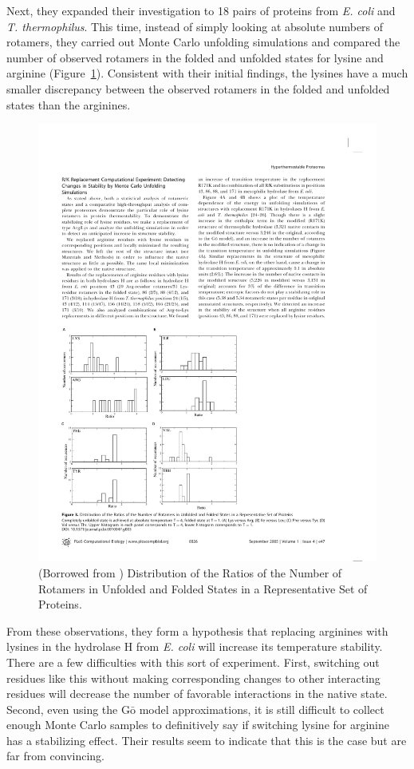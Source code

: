 Next, they expanded their investigation to 18 pairs of proteins from \emph{E. coli} and \emph{T. thermophilus}. This time, instead of simply looking at absolute numbers of rotamers, they carried out Monte Carlo unfolding simulations and compared the number of observed rotamers in the folded and unfolded states for lysine and arginine (Figure~\ref{fig:rotamer_ratios}). Consistent with their initial findings, the lysines have a much smaller discrepancy between the observed rotamers in the folded and unfolded states than the arginines.

\begin{figure}[h]
	\center
	\includegraphics{rotamer_ratio}
	\caption{(Borrowed from \cite{Berezovsky:2005p40}) Distribution of the Ratios of the Number of Rotamers in Unfolded and Folded States in a Representative Set of Proteins.}
	\label{fig:rotamer_ratios}
\end{figure}

From these observations, they form a hypothesis that replacing arginines with lysines in the hydrolase H from \emph{E. coli} will increase its temperature stability. There are a few difficulties with this sort of experiment. First, switching out residues like this without making corresponding changes to other interacting residues will decrease the number of favorable interactions in the native state. Second, even using the $\mathrm{G\bar{o}}$ model approximations, it is still difficult to collect enough Monte Carlo samples to definitively say if switching lysine for arginine has a stabilizing effect. Their results seem to indicate that this is the case but are far from convincing.


